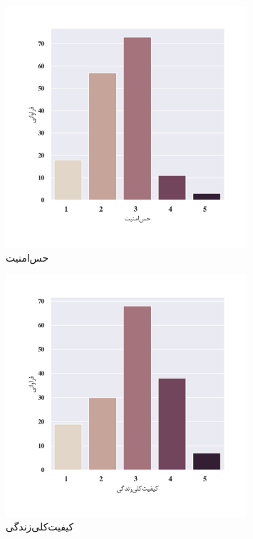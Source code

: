 \begin{figure}[htpb]
    \centering
    \includegraphics[width=0.8\textwidth]{./img/ordinal/SaftyInLifeQuestion.png}
    \caption{حس‌امنیت}
    \label{fig:SaftyInLifeQuestion}
\end{figure}
\begin{figure}[htpb]
    \centering
    \includegraphics[width=0.8\textwidth]{./img/ordinal/TotalQualityOfLife.png}
    \caption{کیفیت‌کلی‌زندگی}
    \label{fig:TotalQualityOfLife}
\end{figure}
